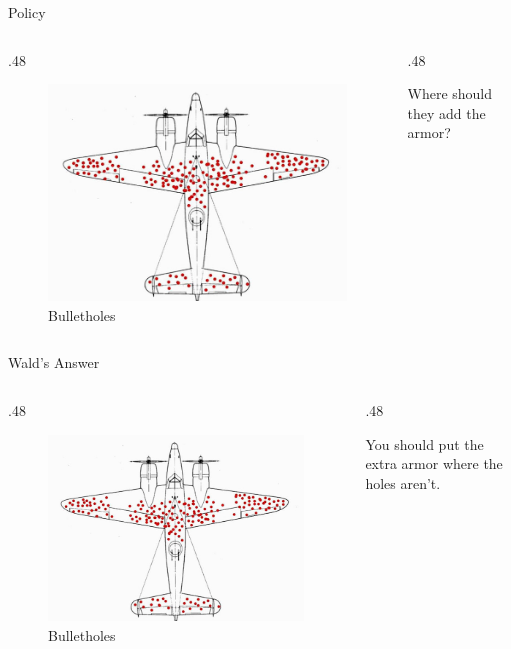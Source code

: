 \documentclass[
  ignorenonframetext,
]{beamer}
\renewcommand{\,}{\text{, }}
\def\begincols{\begin{columns}}
\def\begincol{\begin{column}}
\def\endcol{\end{column}}
\def\endcols{\end{columns}}
\begin{document}
\begin{frame}{Policy}
\protect\hypertarget{policy}{}

\begincols
\begincol{.48\textwidth}

\begin{figure}
\centering
\includegraphics{../images/class10/wald_plane.jpg}
\caption{Bulletholes}
\end{figure}

\endcol
\begincol{.48\textwidth}

Where should they add the armor?

\endcol
\endcols

\end{frame}

\begin{frame}{Wald's Answer}
\protect\hypertarget{walds-answer}{}

\begincols
\begincol{.48\textwidth}

\begin{figure}
\centering
\includegraphics{../images/class10/wald_plane.jpg}
\caption{Bulletholes}
\end{figure}

\endcol
\begincol{.48\textwidth}

You should put the extra armor where the holes aren't.

\endcol
\endcols

\end{frame}
\end{document}
